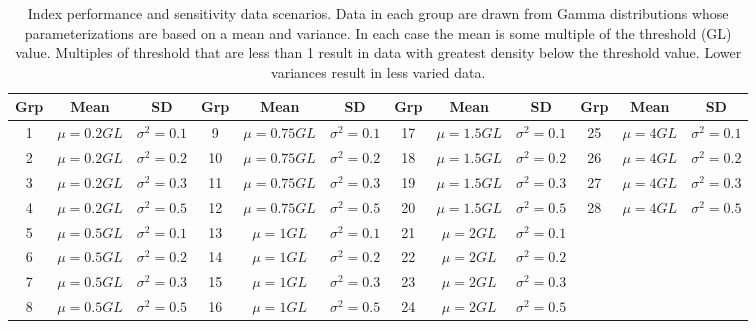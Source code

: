 \begin{table}[htbp]
\setlength{\tabcolsep}{5pt}
\caption{Index performance and sensitivity data scenarios. Data in each group are drawn from Gamma distributions whose parameterizations are based on a mean and variance.  In each case the mean is some multiple of the threshold (GL) value.
Multiples of threshold that are less than 1 result in data with greatest density below the threshold value.  Lower variances result in less varied data.}\label{tab:datascenarios}  
\scriptsize\begin{tabular}{ccc||ccc||ccc||ccc}
\toprule
Grp & Mean & SD & Grp & Mean & SD & Grp & Mean & SD & Grp & Mean & SD\\
\midrule	  
1 & $\mu = 0.2GL$ & $\sigma^2=0.1$ & 9 & $\mu = 0.75GL$ & $\sigma^2=0.1$ & 17 & $\mu = 1.5GL$ & $\sigma^2=0.1$  & 25 & $\mu = 4GL$ & $\sigma^2=0.1$\\
2 & $\mu = 0.2GL$ & $\sigma^2=0.2$ & 10& $\mu = 0.75GL$ & $\sigma^2=0.2$ & 18 & $\mu = 1.5GL$ & $\sigma^2=0.2$  & 26 & $\mu = 4GL$ & $\sigma^2=0.2$\\
3 & $\mu = 0.2GL$ & $\sigma^2=0.3$ & 11& $\mu = 0.75GL$ & $\sigma^2=0.3$ & 19 & $\mu = 1.5GL$ & $\sigma^2=0.3$  & 27 & $\mu = 4GL$ & $\sigma^2=0.3$\\
4 & $\mu = 0.2GL$ & $\sigma^2=0.5$ & 12& $\mu = 0.75GL$ & $\sigma^2=0.5$ & 20 & $\mu = 1.5GL$ & $\sigma^2=0.5$  & 28 & $\mu = 4GL$ & $\sigma^2=0.5$\\
5 & $\mu = 0.5GL$ & $\sigma^2=0.1$ & 13& $\mu = 1GL$ & $\sigma^2=0.1$ & 21 & $\mu = 2GL$ & $\sigma^2=0.1$\\
6 & $\mu = 0.5GL$ & $\sigma^2=0.2$ & 14& $\mu = 1GL$ & $\sigma^2=0.2$ & 22 & $\mu = 2GL$ & $\sigma^2=0.2$\\          
7 & $\mu = 0.5GL$ & $\sigma^2=0.3$ & 15& $\mu = 1GL$ & $\sigma^2=0.3$ & 23 & $\mu = 2GL$ & $\sigma^2=0.3$\\
8 & $\mu = 0.5GL$ & $\sigma^2=0.5$ & 16& $\mu = 1GL$ & $\sigma^2=0.5$ & 24 & $\mu = 2GL$ & $\sigma^2=0.5$\\          
\bottomrule
\end{tabular}	
\end{table}


